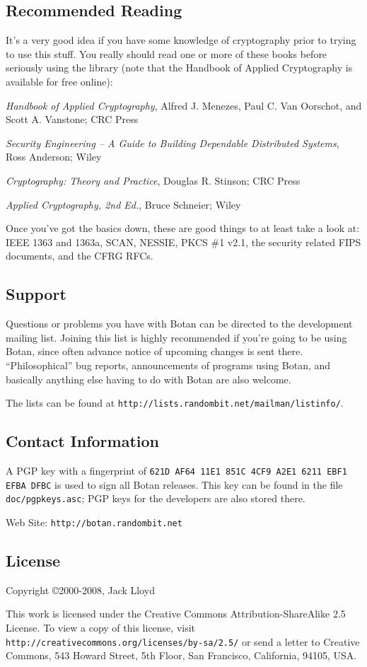 \documentclass{article}
\newcommand{\filename}[1]{\texttt{#1}}
\newcommand{\url}[1]{\texttt{#1}}
\begin{document}
\subsection{Recommended Reading}

It's a very good idea if you have some knowledge of cryptography prior
to trying to use this stuff. You really should read one or more of
these books before seriously using the library (note that the Handbook
of Applied Cryptography is available for free online):

\setlength{\parskip}{5pt}

\noindent
\textit{Handbook of Applied Cryptography}, Alfred J. Menezes,
Paul C. Van Oorschot, and Scott A. Vanstone; CRC Press

\noindent
\textit{Security Engineering -- A Guide to Building Dependable Distributed
Systems}, Ross Anderson; Wiley

\noindent
\textit{Cryptography: Theory and Practice}, Douglas R. Stinson; CRC Press

\noindent
\textit{Applied Cryptography, 2nd Ed.}, Bruce Schneier; Wiley

\noindent
Once you've got the basics down, these are good things to at least take a look
at: IEEE 1363 and 1363a, SCAN, NESSIE, PKCS \#1 v2.1, the security related FIPS
documents, and the CFRG RFCs.

\subsection{Support}

Questions or problems you have with Botan can be directed to the
development mailing list. Joining this list is highly recommended if
you're going to be using Botan, since often advance notice of upcoming
changes is sent there. ``Philosophical'' bug reports, announcements of
programs using Botan, and basically anything else having to do with
Botan are also welcome.

The lists can be found at
\url{http://lists.randombit.net/mailman/listinfo/}.

\subsection{Contact Information}

A PGP key with a fingerprint of
\verb|621D AF64 11E1 851C 4CF9 A2E1 6211 EBF1 EFBA DFBC| is used to sign all
Botan releases. This key can be found in the file \filename{doc/pgpkeys.asc};
PGP keys for the developers are also stored there.

\vskip 5pt \noindent
Web Site: \url{http://botan.randombit.net}

\subsection{License}

Copyright \copyright  2000-2008, Jack Lloyd

This work is licensed under the Creative Commons
Attribution-ShareAlike 2.5 License. To view a copy of this license,
visit \url{http://creativecommons.org/licenses/by-sa/2.5/} or send a
letter to Creative Commons, 543 Howard Street, 5th Floor, San
Francisco, California, 94105, USA.
\end{document}
